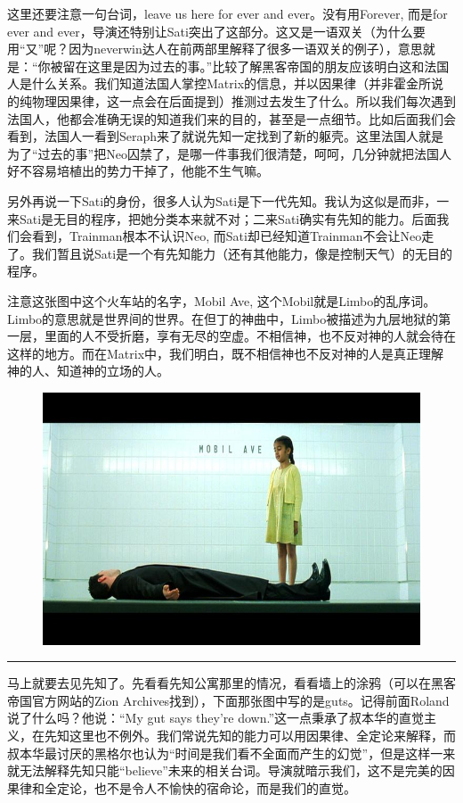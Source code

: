 \documentclass[UTF8]{ctexart}
\newcommand{\myparsep}{\noindent \rule[0.5ex]{\linewidth}{1pt}}
\begin{document}
这里还要注意一句台词，leave us here for ever and ever。没有用Forever, 而是for ever and ever，导演还特别让Sati突出了这部分。这又是一语双关（为什么要用“又”呢？因为neverwin达人在前两部里解释了很多一语双关的例子），意思就是：“你被留在这里是因为过去的事。”比较了解黑客帝国的朋友应该明白这和法国人是什么关系。我们知道法国人掌控Matrix的信息，并以因果律（并非霍金所说的纯物理因果律，这一点会在后面提到）推测过去发生了什么。所以我们每次遇到法国人，他都会准确无误的知道我们来的目的，甚至是一点细节。比如后面我们会看到，法国人一看到Seraph来了就说先知一定找到了新的躯壳。这里法国人就是为了“过去的事”把Neo囚禁了，是哪一件事我们很清楚，呵呵，几分钟就把法国人好不容易培植出的势力干掉了，他能不生气嘛。

另外再说一下Sati的身份，很多人认为Sati是下一代先知。我认为这似是而非，一来Sati是无目的程序，把她分类本来就不对；二来Sati确实有先知的能力。后面我们会看到，Trainman根本不认识Neo, 而Sati却已经知道Trainman不会让Neo走了。我们暂且说Sati是一个有先知能力（还有其他能力，像是控制天气）的无目的程序。

注意这张图中这个火车站的名字，Mobil Ave, 这个Mobil就是Limbo的乱序词。Limbo的意思就是世界间的世界。在但丁的神曲中，Limbo被描述为九层地狱的第一层，里面的人不受折磨，享有无尽的空虚。不相信神，也不反对神的人就会待在这样的地方。而在Matrix中，我们明白，既不相信神也不反对神的人是真正理解神的人、知道神的立场的人。

\begin{figure}[htb]
\centering
\includegraphics[width=0.5\linewidth]{fig/e36b4a3679b53bdda3cc2b19.jpg}
\end{figure}

\myparsep

马上就要去见先知了。先看看先知公寓那里的情况，看看墙上的涂鸦（可以在黑客帝国官方网站的Zion Archives找到），下面那张图中写的是guts。记得前面Roland说了什么吗？他说：“My gut says they're down.”这一点秉承了叔本华的直觉主义，在先知这里也不例外。我们常说先知的能力可以用因果律、全定论来解释，而叔本华最讨厌的黑格尔也认为“时间是我们看不全面而产生的幻觉”，但是这样一来就无法解释先知只能“believe”未来的相关台词。导演就暗示我们，这不是完美的因果律和全定论，也不是令人不愉快的宿命论，而是我们的直觉。
\end{document}
